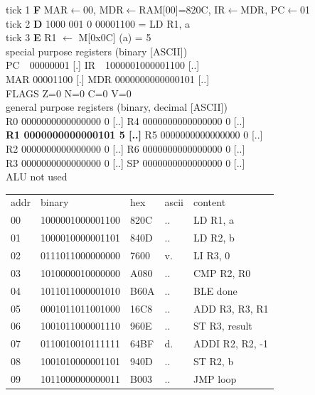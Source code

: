 \noindent\begin{tcolorbox}[stepbox, title={Instruction 1 \hfill ticks 1 to 3 \quad LD R1, a}]
\textcolor{dim}{tick 1} \textbf{F} MAR$\leftarrow$00, MDR$\leftarrow$RAM[00]=820C, IR$\leftarrow$MDR, PC$\leftarrow$01\\
\textcolor{dim}{tick 2} \textbf{D} 1000 001 0 00001100 = LD R1, a\\
\textcolor{dim}{tick 3} \textbf{E} R1 $\leftarrow$ M[0x0C] (a) = 5\\[2pt]
\textcolor{dim}{special purpose registers (binary [ASCII])}\\
PC~~00000001 [.] \hfill IR~~1000001000001100 [..]\\
MAR 00001100 [.] \hfill MDR 0000000000000101 [..]\\
FLAGS Z=0 N=0 C=0 V=0\\[2pt]
\textcolor{dim}{general purpose registers (binary, decimal [ASCII])}\\
R0 0000000000000000 0 [..] \hfill R4 0000000000000000 0 [..]\\
\textcolor{wrt}{\textbf{R1 0000000000000101 5 [..]}} \hfill R5 0000000000000000 0 [..]\\
R2 0000000000000000 0 [..] \hfill R6 0000000000000000 0 [..]\\
R3 0000000000000000 0 [..] \hfill SP 0000000000000000 0 [..]\\
\textcolor{dim}{ALU not used}\\[2pt]
{\setlength{\tabcolsep}{2pt}\begin{tabular}{@{}lllll@{}}
\textcolor{dim}{addr} & \textcolor{dim}{binary} & \textcolor{dim}{hex} & \textcolor{dim}{ascii} & \textcolor{dim}{content}\\
00 & 1000001000001100 & 820C & .. & LD R1, a\\
\rowcolor{pcc}01 & 1000010000001101 & 840D & .. & LD R2, b\\
02 & 0111011000000000 & 7600 & v. & LI R3, 0\\
03 & 1010000010000000 & A080 & .. & CMP R2, R0\\
04 & 1011011000001010 & B60A & .. & BLE done\\
05 & 0001011011001000 & 16C8 & .. & ADD R3, R3, R1\\
06 & 1001011000001110 & 960E & .. & ST R3, result\\
07 & 0110010010111111 & 64BF & d. & ADDI R2, R2, -1\\
08 & 1001010000001101 & 940D & .. & ST R2, b\\
09 & 1011000000000011 & B003 & .. & JMP loop\\

\end{tabular}}
\end{tcolorbox}
